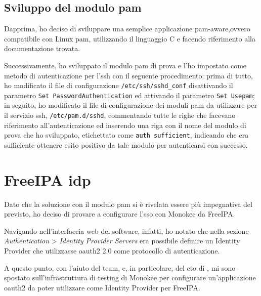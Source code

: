 \subsection{Sviluppo del modulo \acrshort{pam}}
Dapprima, ho deciso di sviluppare una semplice applicazione \acrshort{pam}-aware,ovvero compatibile con Linux \acrshort{pam}, utilizzando il linguaggio C e facendo riferimento alla documentazione trovata.  

Successivamente, ho sviluppato il modulo \acrshort{pam} di prova e l'ho impostato come metodo di autenticazione per l'\acrshort{ssh} con il seguente procedimento: prima di tutto, ho modificato il file di configurazione \texttt{/etc/ssh/sshd\_conf} disattivando il parametro \texttt{Set PasswordAuthentication} ed attivando il parametro \texttt{Set Use\acrshort{pam}}; in seguito, ho modificato il file di configurazione dei moduli \acrshort{pam} da utilizzare per il servizio \acrshort{ssh}, \texttt{/etc/pam.d/sshd}, commentando tutte le righe che facevano riferimento all'autenticazione ed inserendo una riga con il nome del modulo di prova che ho sviluppato, etichettato come \texttt{auth  sufficient}, indicando che era sufficiente ottenere esito positivo da tale modulo per autenticarsi con successo. 

\section{FreeIPA \acrshort{idp}}

Dato che la soluzione con il modulo \acrshort{pam} si è rivelata essere più impegnativa del previsto, ho deciso di provare a configurare l'\acrshort{sso} con Monokee da FreeIPA. 

Navigando nell'interfaccia web del software, infatti, ho notato che nella sezione \textit{Authentication} > \textit{Identity Provider Servers} era possibile definire un Identity Provider che utilizzasse \acrshort{oauth2} 2.0 come protocollo di autenticazione.

A questo punto, con l'aiuto del team, e, in particolare, del \acrfull{cto} di \myAzienda, mi sono spostato sull'infrastruttura di testing di Monokee per configurare un'applicazione \acrshort{oauth2} da poter utilizzare come Identity Provider per FreeIPA.

